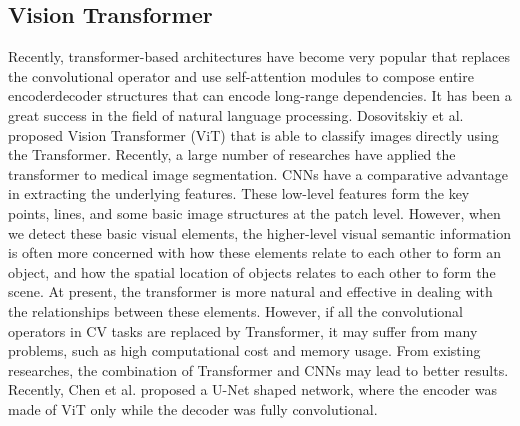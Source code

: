 \subsection{Vision Transformer}
Recently, transformer-based architectures have become very popular that replaces
the convolutional operator and use self-attention modules to compose entire
encoderdecoder structures that can encode long-range dependencies.
It has been a great success in the field of natural language processing.
Dosovitskiy et al. proposed Vision Transformer (ViT) that is able to classify
images directly using the Transformer.
Recently, a large number of researches have applied the transformer to medical
image segmentation. CNNs have a comparative advantage in extracting the
underlying features. These low-level features form the key points, lines, and
some basic image structures at the patch level. However, when we detect these
basic visual elements, the higher-level visual semantic information is often
more concerned with how these elements relate to each other to form an object,
and how the spatial location of objects relates to each other to form the scene.
At present, the transformer is more natural and effective in dealing with the
relationships between these elements. However, if all the convolutional
operators in CV tasks are replaced by Transformer, it may suffer from many
problems, such as high computational cost and memory usage. From existing
researches, the combination of Transformer and CNNs may lead to better results.
Recently, Chen et al. proposed a U-Net shaped network, where the encoder was
made of ViT only while the decoder was fully convolutional.





